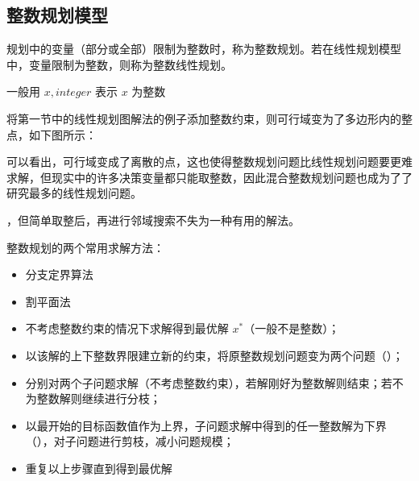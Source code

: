 \documentclass[letterpaper,10pt,english]{sphinxmanual}
\begin{document}
\subsection{整数规划模型}
\label{\detokenize{docs/LP:id11}}
规划中的变量（部分或全部）限制为整数时，称为整数规划。若在线性规划模型中，变量限制为整数，则称为整数线性规划。



一般用 \(x , integer\) 表示 \(x\) 为整数

将第一节中的线性规划图解法的例子添加整数约束，则可行域变为了多边形内的整点，如下图所示：


可以看出，可行域变成了离散的点，这也使得整数规划问题比线性规划问题要更难求解，但现实中的许多决策变量都只能取整数，因此混合整数规划问题也成为了了研究最多的线性规划问题。

，但简单取整后，再进行邻域搜索不失为一种有用的解法。

整数规划的两个常用求解方法：
\begin{itemize}
\item {} 
分支定界算法

\item {} 
割平面法

\end{itemize}

\begin{itemize}
\item {} 
不考虑整数约束的情况下求解得到最优解 \(x^*\)（一般不是整数）；

\item {} 
以该解的上下整数界限建立新的约束，将原整数规划问题变为两个问题（）；

\item {} 
分别对两个子问题求解（不考虑整数约束），若解刚好为整数解则结束；若不为整数解则继续进行分枝；

\item {} 
以最开始的目标函数值作为上界，子问题求解中得到的任一整数解为下界（），对子问题进行剪枝，减小问题规模；

\item {} 
重复以上步骤直到得到最优解

\end{itemize}
\end{document}
